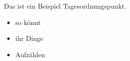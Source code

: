 
Das ist ein Beispiel Tagesordnungspunkt.
\begin{itemize}
  \item so könnt 
  \item ihr Dinge 
  \item Aufzählen 
\end{itemize}


